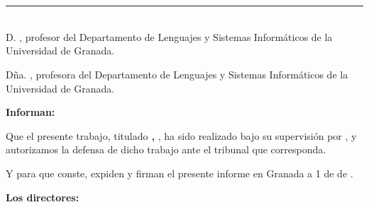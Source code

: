 \chapter*{}
\thispagestyle{empty}

\noindent\rule[-1ex]{\textwidth}{2pt}\\[4.5ex]

D. \textbf{\tfgtutornameA}, profesor del Departamento de Lenguajes y Sistemas Informáticos de la Universidad de Granada.

\vspace{0.5cm}

Dña. \textbf{\tfgtutornameB}, profesora del Departamento de Lenguajes y Sistemas Informáticos de la Universidad de Granada.


\vspace{0.5cm}

\textbf{Informan:}

\vspace{0.5cm}

Que el presente trabajo, titulado \textit{\textbf{\tfgtitlename, \tfgsubtitlename}},
ha sido realizado bajo su supervisión por \textbf{\tfgauthorname}, y autorizamos la defensa de dicho trabajo ante el tribunal
que corresponda.

\vspace{0.5cm}

Y para que conste, expiden y firman el presente informe en Granada a 1 de \tfgmes{} de \tfganno.


\vspace{0.5cm}

\textbf{Los directores:}

\vspace{3.5cm}

\noindent \textbf{\tfgtutornameA \ \ \ \ \ \ \ \tfgtutornameB}
